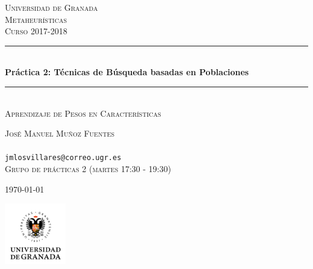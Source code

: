 \documentclass{article}
\begin{document}
\begin{titlepage} %
	\newcommand{\HRule}{\rule{\linewidth}{0.5mm}} %
	
	\center %
	
	
	\textsc{\LARGE Universidad de Granada}\\[1.5cm] %
	
	\textsc{Metaheurísticas}\\[0.3cm] %
	
	\textsc{Curso 2017-2018}\\[0.5cm] %
	
	
	\HRule\\[0.4cm]
	{\huge\bfseries Práctica 2: Técnicas de Búsqueda basadas en Poblaciones}\\[0.4cm] %
	
	\HRule\\[1.5cm]
	
	\textsc{Aprendizaje de Pesos en Características}\\[0.5cm]
	
	\vfill

	\textsc{José Manuel Muñoz Fuentes}\\
	\\
	\texttt{jmlosvillares@correo.ugr.es}\\
	{\footnotesize\textsc{Grupo de prácticas 2 (martes 17:30 - 19:30)}}

	\vfill\vfill\vfill %
	
	{\large\today} %

	\vfill\vfill
	\includegraphics[width=0.2\textwidth]{ugr.png}\\[1cm] %
	
	
	\vfill %
	
\end{titlepage}
\tableofcontents
\end{document}

